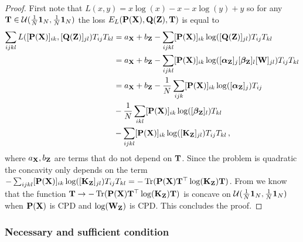 \begin{proof}
	First note that $L(x,y) = x \log(x)-x - x \log(y) +y$ so for any ${\mathbf{T}} \in {\mathcal{U}}(\frac{1}{N}\bm{1}_N, \frac{1}{N}\bm{1}_N)$ the loss $E_{L}({\mathbf{P}}({\mathbf{X}}), {\mathbf{Q}}({\mathbf{Z}}), {\mathbf{T}})$ is equal to
	\begin{equation}
		\begin{split}
			\sum_{ijkl} L([{\mathbf{P}}({\mathbf{X}})]_{ik}, [{\mathbf{Q}}({\mathbf{Z}})]_{jl}) T_{ij} T_{kl} &= a_{\mathbf{X}}+ b_{\mathbf{Z}} - \sum_{ijkl} [{\mathbf{P}}({\mathbf{X}})]_{ik}\log([{\mathbf{Q}}({\mathbf{Z}})]_{jl}) T_{ij} T_{kl} \\
			&=a_{\mathbf{X}}+ b_{\mathbf{Z}} - \sum_{ijkl} [{\mathbf{P}}({\mathbf{X}})]_{ik}\log([\boldsymbol\alpha_{\mathbf{Z}}]_j [\boldsymbol\beta_{\mathbf{Z}}]_l [{\mathbf{W}}]_{jl}) T_{ij} T_{kl} \\
			&=a_{\mathbf{X}}+ b_{\mathbf{Z}} - \frac{1}{N}\sum_{ijk} [{\mathbf{P}}({\mathbf{X}})]_{ik}\log([\boldsymbol\alpha_{\mathbf{Z}}]_j) T_{ij}  \\
			&- \frac{1}{N} \sum_{ikl} [{\mathbf{P}}({\mathbf{X}})]_{ik}\log([\boldsymbol\beta_{\mathbf{Z}}]_l) T_{kl}\\
			&-\sum_{ijkl} [{\mathbf{P}}({\mathbf{X}})]_{ik}\log([{\mathbf{K}}_{\mathbf{Z}}]_{jl}) T_{ij} T_{kl}\,,
		\end{split}
	\end{equation}
	where $a_{\mathbf{X}}, b_{\mathbf{Z}}$ are terms that do not depend on ${\mathbf{T}}$. Since the problem is quadratic the concavity only depends on the term $-\sum_{ijkl} [{\mathbf{P}}({\mathbf{X}})]_{ik}\log([{\mathbf{K}}_{\mathbf{Z}}]_{jl}) T_{ij} T_{kl} = -\operatorname{Tr}({\mathbf{P}}({\mathbf{X}}) {\mathbf{T}}^\top \log({\mathbf{K}}_{\mathbf{Z}}) {\mathbf{T}})$. From \citep{maron2018probably} we know that the function ${\mathbf{T}} \to -\operatorname{Tr}({\mathbf{P}}({\mathbf{X}}) {\mathbf{T}}^\top \log({\mathbf{K}}_{\mathbf{Z}}) {\mathbf{T}})$ is concave on ${\mathcal{U}}(\frac{1}{N} \bm{1}_N, \frac{1}{N} \bm{1}_N)$ when ${\mathbf{P}}({\mathbf{X}})$ is CPD and $\log({\mathbf{W}}_{\mathbf{Z}})$ is CPD. This concludes the proof.	
\end{proof}

\subsubsection{Necessary and sufficient condition \label{sec:necessary_and_sufficient}}

